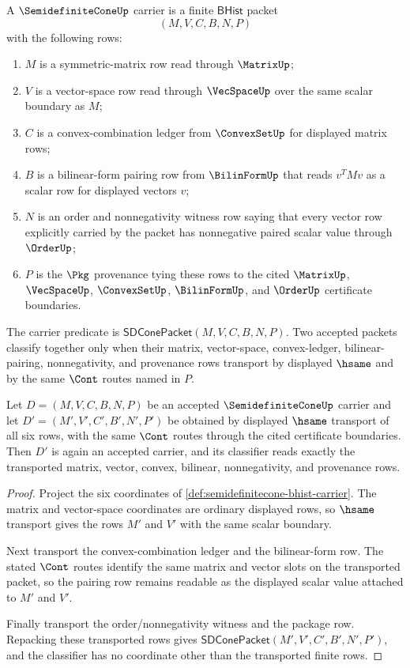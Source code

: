 \begin{definition}
\label{def:semidefinitecone-bhist-carrier}
A $\SemidefiniteConeUp$ carrier is a finite $\mathsf{BHist}$ packet
$$
(M,V,C,B,N,P)
$$
with the following rows:
\begin{enumerate}
\item $M$ is a symmetric-matrix row read through $\MatrixUp$;
\item $V$ is a vector-space row read through $\VecSpaceUp$ over the same scalar boundary as $M$;
\item $C$ is a convex-combination ledger from $\ConvexSetUp$ for displayed matrix rows;
\item $B$ is a bilinear-form pairing row from $\BilinFormUp$ that reads $v^{T}Mv$ as a scalar row for displayed vectors $v$;
\item $N$ is an order and nonnegativity witness row saying that every vector row explicitly carried by the packet has nonnegative paired scalar value through $\OrderUp$;
\item $P$ is the $\Pkg$ provenance tying these rows to the cited $\MatrixUp$, $\VecSpaceUp$, $\ConvexSetUp$, $\BilinFormUp$, and $\OrderUp$ certificate boundaries.
\end{enumerate}
The carrier predicate is $\mathsf{SDConePacket}(M,V,C,B,N,P)$. Two accepted packets classify together only when their matrix, vector-space, convex-ledger, bilinear-pairing, nonnegativity, and provenance rows transport by displayed $\hsame$ and by the same $\Cont$ routes named in $P$.
\end{definition}

\begin{theorem}
\label{thm:semidefinitecone-carrier-stability}
Let $D=(M,V,C,B,N,P)$ be an accepted $\SemidefiniteConeUp$ carrier and let $D'=(M',V',C',B',N',P')$ be obtained by displayed $\hsame$ transport of all six rows, with the same $\Cont$ routes through the cited certificate boundaries. Then $D'$ is again an accepted carrier, and its classifier reads exactly the transported matrix, vector, convex, bilinear, nonnegativity, and provenance rows.
\end{theorem}
\begin{proof}
Project the six coordinates of \autoref{def:semidefinitecone-bhist-carrier}. The matrix and vector-space coordinates are ordinary displayed rows, so $\hsame$ transport gives the rows $M'$ and $V'$ with the same scalar boundary.

Next transport the convex-combination ledger and the bilinear-form row. The stated $\Cont$ routes identify the same matrix and vector slots on the transported packet, so the pairing row remains readable as the displayed scalar value attached to $M'$ and $V'$.

Finally transport the order/nonnegativity witness and the package row. Repacking these transported rows gives $\mathsf{SDConePacket}(M',V',C',B',N',P')$, and the classifier has no coordinate other than the transported finite rows.
\end{proof}


